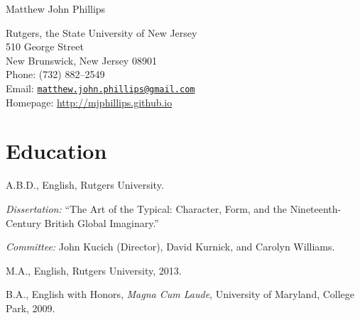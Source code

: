 \documentclass[10pt,letterpaper]{article}
\def\name{Matthew John Phillips}
\renewenvironment{itemize}{
  \begin{list}{}{
    \setlength{\leftmargin}{1.5em}
    \setlength{\itemsep}{0.25em}
    \setlength{\parskip}{0pt}
    \setlength{\parsep}{0.25em}
  }
}{
  \end{list}
}
\begin{document}
	\raggedright

{\huge \name}


\bigskip

\begin{minipage}[t]{0.495\textwidth}
  Rutgers, the State University of New Jersey \\
  510 George Street \\
  New Brunswick, New Jersey 08901 \\
    Phone: (732) 882--2549 \\
Email: \texttt{\href{mailto:matthew.john.phillips@gmail.com}{matthew.john.phillips@gmail.com}} \\
Homepage: \href{http://mjphillips.github.io}{http://mjphillips.github.io}
\end{minipage}


\section*{Education}

\begin{itemize}
  \item A.B.D., English, Rutgers University.
    \begin{itemize}
    \item \emph{Dissertation:} ``The Art of the Typical: Character, Form, and the Nineteenth-Century British Global Imaginary.''
    \item \emph{Committee:} John Kucich (Director), David Kurnick, and Carolyn Williams.
    \end{itemize}
  \item M.A., English, Rutgers University, 2013.
  \item B.A., English with Honors, \textit{Magna Cum Laude},
    University of Maryland, College Park, 2009.
\end{itemize}

\end{document}
